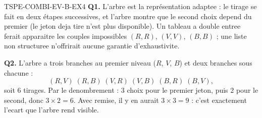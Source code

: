 \begin{corrige}{TSPE-COMBI-EV-B-EX4}
\textbf{Q1.} L'arbre est la représentation adaptee : le tirage se fait en deux étapes successives, et l'arbre montre que le second choix depend du premier (le jeton deja tire n'est plus disponible). Un tableau a double entree ferait apparaitre les couples impossibles $(R,R)$, $(V,V)$, $(B,B)$ ; une liste non structuree n'offrirait aucune garantie d'exhaustivite.

\textbf{Q2.} L'arbre a trois branches au premier niveau ($R$, $V$, $B$) et deux branches sous chacune :
\[
  (R,V)\;(R,B)\;(V,R)\;(V,B)\;(B,R)\;(B,V),
\]
soit $\boxed{6}$ tirages. Par le denombrement : $3$ choix pour le premier jeton, puis $2$ pour le second, donc $3\times2=6$. Avec remise, il y en aurait $3\times3=9$ : c'est exactement l'ecart que l'arbre rend visible.
\end{corrige}
